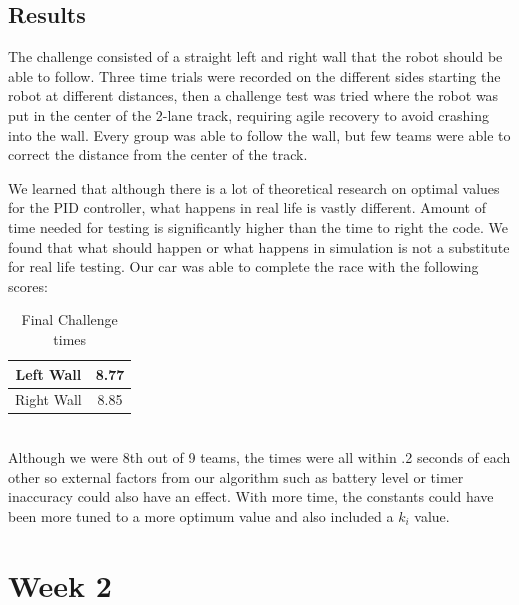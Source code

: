 \documentclass[journal, a4paper]{IEEEtran}
\begin{document}
\subsection{Results}
The challenge consisted of a straight left and right wall that the robot should be able to follow. Three time trials were recorded on the different sides starting the robot at different distances, then a challenge test was tried where the robot was put in the center of the 2-lane track, requiring agile recovery to avoid crashing into the wall. Every group was able to follow the wall, but few teams were able to correct the distance from the center of the track. 
\par We learned that although there is a lot of theoretical research on optimal values for the PID controller, what happens in real life is vastly different. Amount of time needed for testing is significantly higher than the time to right the code. We found that what should happen or what happens in simulation is not a substitute for real life testing. Our car was able to complete the race with the following scores: \\
    \begin{table}[!hbt]
        \begin{center}
        \caption{Final Challenge times}
        \begin{tabular}{|c|c|}
            \hline
            Left Wall & 8.77 \\
            \hline
            Right Wall & 8.85 \\
            \hline
        \end{tabular}
        \end{center}
    \end{table} \\
Although we were 8th out of 9 teams, the times were all within .2 seconds of each other so external factors from our algorithm such as battery level or timer inaccuracy could also have an effect. With more time, the constants could have been more tuned to a more optimum value and also included a $k_i$ value.
\section{Week 2}
\end{document}
